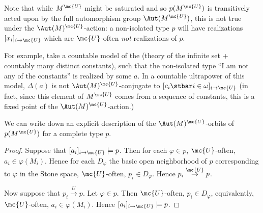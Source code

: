 Note that while $M^{\mc{U}}$ might be saturated and so $p(M^{\mc{U}})$ is transitively acted upon by the full automorphism group $\Aut(M^{\mc{U}})$, this is not true under the $\Aut(M)^{\mc{U}}$-action: a non-isolated type $p$ will have realizations $[x_i]_{i \to \mc{U}}$ which are $\mc{U}$-often \emph{not} realizations of $p$.

For example, take a countable model of the (theory of the infinite set + countably many distinct constants), such that the non-isolated type ``I am not any of the constants'' is realized by some $a$. In a countable ultrapower of this model, $\Delta(a)$ is not $\Aut(M)^{\mc{U}}$-conjugate to $[c_i \stbar i \in \omega]_{i \to \mc{U}}$ (in fact, since this element of $M^{\mc{U}}$ comes from a sequence of constants, this is a fixed point of the $\Aut(M)^{\mc{U}}$-action.)

We can write down an explicit description of the $\Aut(M)^{\mc{U}}$-orbits of $p(M^{\mc{U}})$ for a complete type $p$.

\begin{proof}
  Suppose that $[a_i]_{i \to \mc{U}} \models p$. Then for each $\varphi \in p$, $\mc{U}$-often, $a_i \in \varphi(M_i)$. Hence for each $D_{\varphi}$ the basic open neighborhood of $p$ corresponding to $\varphi$ in the Stone space, $\mc{U}$-often, $p_i \in D_{\varphi}$. Hence $p_i \overset{\mc{U}}{\to} p$.

  Now suppose that $p_i \overset{U}{\to} p$. Let $\varphi \in p$. Then $\mc{U}$-often, $p_i \in D_{\varphi}$, equivalently, $\mc{U}$-often, $a_i \in \varphi(M_i)$. Hence $[a_i]_{i \to \mc{U}} \models p$.
\end{proof}



